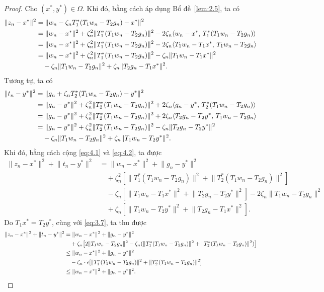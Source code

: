 \documentclass[11pt,a4paper]{article}
\theoremstyle{plain}
\theoremstyle{definition}
\theoremstyle{remark}
\numberwithin{equation}{section}
\newcommand{\inp}[2]{\langle #1,\,#2\rangle}
\newcommand{\nm}[1]{\lVert #1\rVert}
\begin{document}
\begin{proof}
Cho $(x^{*},y^{*})\in\Omega$. Khi đó, bằng cách áp dụng Bổ đề~\ref{lem:2.5}, ta có
\begin{align}
\nm{z_n-x^{*}}^2 &= \nm{w_n-\zeta_n T_1^{*}(T_1w_n-T_2g_n)-x^{*}}^2\notag\\
&= \nm{w_n-x^{*}}^2+\zeta_n^2\nm{T_1^{*}(T_1w_n-T_2g_n)}^2-2\zeta_n\inp{w_n-x^{*}}{T_1^{*}(T_1w_n-T_2g_n)}\notag\\
&= \nm{w_n-x^{*}}^2+\zeta_n^2\nm{T_1^{*}(T_1w_n-T_2g_n)}^2-2\zeta_n\inp{T_1w_n-T_1x^{*}}{T_1w_n-T_2g_n}\notag\\
&= \nm{w_n-x^{*}}^2+\zeta_n^2\nm{T_1^{*}(T_1w_n-T_2g_n)}^2-\zeta_n\nm{T_1w_n-T_1x^{*}}^2\notag\\
&\quad -\zeta_n\nm{T_1w_n-T_2g_n}^2+\zeta_n\nm{T_2g_n-T_1x^{*}}^2. \label{eq:4.1}
\end{align}
Tương tự, ta có
\begin{align}
\nm{t_n-y^{*}}^2 &= \nm{g_n+\zeta_n T_2^{*}(T_1w_n-T_2g_n)-y^{*}}^2\notag\\
&= \nm{g_n-y^{*}}^2+\zeta_n^2\nm{T_2^{*}(T_1w_n-T_2g_n)}^2+2\zeta_n\inp{g_n-y^{*}}{T_2^{*}(T_1w_n-T_2g_n)}\notag\\
&= \nm{g_n-y^{*}}^2+\zeta_n^2\nm{T_2^{*}(T_1w_n-T_2g_n)}^2+2\zeta_n\inp{T_2g_n-T_2y^{*}}{T_1w_n-T_2g_n}\notag\\
&= \nm{g_n-y^{*}}^2+\zeta_n^2\nm{T_2^{*}(T_1w_n-T_2g_n)}^2-\zeta_n\nm{T_2g_n-T_2y^{*}}^2\notag\\
&\quad -\zeta_n\nm{T_1w_n-T_2g_n}^2+\zeta_n\nm{T_1w_n-T_2y^{*}}^2. \label{eq:4.2}
\end{align}
Khi đó, bằng cách cộng \eqref{eq:4.1} và \eqref{eq:4.2}, ta được
\begin{align*}
\nm{z_n-x^{*}}^2+\nm{t_n-y^{*}}^2 &= \nm{w_n-x^{*}}^2+\nm{g_n-y^{*}}^2\\
&\quad +\zeta_n^2[\nm{T_1^{*}(T_1w_n-T_2g_n)}^2+\nm{T_2^{*}(T_1w_n-T_2g_n)}^2]\\
&\quad -\zeta_n[\nm{T_1w_n-T_1x^{*}}^2+\nm{T_2g_n-T_2y^{*}}^2]-2\zeta_n\nm{T_1w_n-T_2g_n}^2\\
&\quad +\zeta_n[\nm{T_1w_n-T_2y^{*}}^2+\nm{T_2g_n-T_1x^{*}}^2].
\end{align*}
Do $T_1x^{*}=T_2y^{*}$, cùng với \eqref{eq:3.7}, ta thu được
\begin{align}
\nm{z_n-x^{*}}^2+\nm{t_n-y^{*}}^2 &= \nm{w_n-x^{*}}^2+\nm{g_n-y^{*}}^2\notag\\
&\quad +\zeta_n\bigl[2\nm{T_1w_n-T_2g_n}^2-\zeta_n(\nm{T_1^{*}(T_1w_n-T_2g_n)}^2+\nm{T_2^{*}(T_1w_n-T_2g_n)}^2)\bigr]\notag\\
&\le \nm{w_n-x^{*}}^2+\nm{g_n-y^{*}}^2\notag\\
&\quad -\zeta_n\cdot\epsilon[\nm{T_1^{*}(T_1w_n-T_2g_n)}^2+\nm{T_2^{*}(T_1w_n-T_2g_n)}^2]\notag\\
&\le \nm{w_n-x^{*}}^2+\nm{g_n-y^{*}}^2. \label{eq:4.3}
\end{align}
\end{proof}
\end{document}
